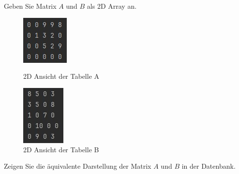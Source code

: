 \documentclass[11pt]{scrartcl}
\begin{document}
Geben Sie Matrix $A$ und $B$ als 2D Array an.
\begin{figure}[H]
    \begin{minipage}[b]{.4\linewidth}
        \begin{center}
            \includegraphics{2d_table_matrix_a.jpg}
        \end{center}
        \caption{2D Ansicht der Tabelle A}
    \end{minipage}
    \hspace{.1\linewidth}
    \begin{minipage}[b]{.4\linewidth}
        \begin{center}
            \includegraphics{2d_table_matrix_b.jpg} 
        \end{center}
        \caption{2D Ansicht der Tabelle B}
    \end{minipage}
\end{figure}

Zeigen Sie die äquivalente Darstellung der Matrix $A$ und $B$ in der Datenbank.
\end{document}
